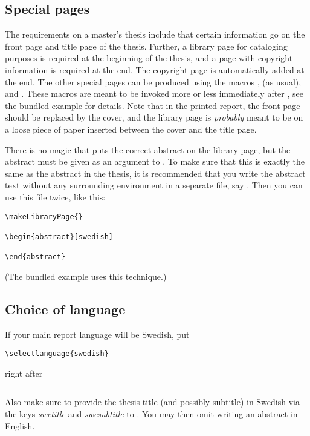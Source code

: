 \subsection{Special pages}
%
The requirements on a master's thesis include that certain information go on the front page and title page of the thesis.  Further, a library page for cataloging purposes is required at the beginning of the thesis, and a page with copyright information is required at the end.  The copyright page is automatically added at the end.  The other special pages can be produced using the macros ,  (as usual), and .  These macros are meant to be invoked more or less immediately after , see the bundled example for details.  Note that in the printed report, the front page should be replaced by the cover, and the library page is \emph{probably} meant to be on a loose piece of paper inserted between the cover and the title page.

There is no magic that puts the correct abstract on the library page, but the abstract must be given as an argument to .  To make sure that this is exactly the same as the abstract in the thesis, it is recommended that you write the abstract text without any surrounding  environment in a separate file, say .  Then you can use this file twice, like this:
{\verbatimsize
\begin{verbatim}
\makeLibraryPage{}

\begin{abstract}[swedish]
  
\end{abstract}
\end{verbatim}}
(The bundled example uses this technique.)

\subsection{Choice of language}
%
If your main report language will be Swedish, put
{\verbatimsize
\begin{verbatim}
\selectlanguage{swedish}
\end{verbatim}}
right after
{\verbatimsize
\begin{verbatim}

\end{verbatim}}
Also make sure to provide the thesis title (and possibly subtitle) in Swedish via the keys \emph{swetitle} and \emph{swesubtitle} to .  You may then omit writing an abstract in English.

